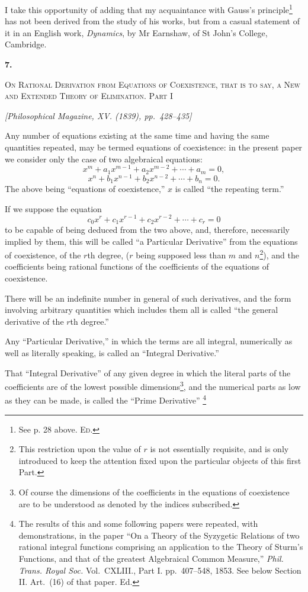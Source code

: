 \documentclass[11pt]{article}
\newcommand{\paperhead}[3]{%
  \clearpage
  \begin{center}
  {\Large\bfseries #1.}\par\vspace{0.85em}
  {\large\scshape #2}\par\vspace{0.6em}
  {\itshape [#3]}\par
  \end{center}\vspace{0.4em}}
\newcommand{\sourcepage}[1]{\marginpar{\scriptsize p.~#1}}
\begin{document}
I take this opportunity of adding that my acquaintance with Gauss's principle\footnote{See p. 28 above. \textsc{Ed.}} has not been derived from the study of his works, but from a casual statement of it in an English work, \emph{Dynamics}, by Mr Earnshaw, of St John's College, Cambridge.



\paperhead{7}{On Rational Derivation from Equations of Coexistence, that is to say, a New and Extended Theory of Elimination. Part I}{Philosophical Magazine, XV. (1839), pp.~428--435}

\sourcepage{40}
Any number of equations existing at the same time and having the same quantities repeated, may be termed equations of coexistence: in the present paper we consider only the case of two algebraical equations:
\[
 x^m+a_1x^{m-1}+a_2x^{m-2}+\cdots+a_m=0,
\]
\[
 x^n+b_1x^{n-1}+b_2x^{n-2}+\cdots+b_n=0.
\]
The above being ``equations of coexistence,'' $x$ is called ``the repeating term.''

If we suppose the equation
\[
 c_0x^r+c_1x^{r-1}+c_2x^{r-2}+\cdots+c_r=0
\]
to be capable of being deduced from the two above, and, therefore, necessarily implied by them, this will be called ``a Particular Derivative'' from the equations of coexistence, of the $r$th degree, ($r$ being supposed less than $m$ and $n$\footnote{This restriction upon the value of $r$ is not essentially requisite, and is only introduced to keep the attention fixed upon the particular objects of this first Part.}), and the coefficients being rational functions of the coefficients of the equations of coexistence.

There will be an indefinite number in general of such derivatives, and the form involving arbitrary quantities which includes them all is called ``the general derivative of the $r$th degree.''

Any ``Particular Derivative,'' in which the terms are all integral, numerically as well as literally speaking, is called an ``Integral Derivative.''

That ``Integral Derivative'' of any given degree in which the literal parts of the coefficients are of the lowest possible dimensions\footnote{Of course the dimensions of the coefficients in the equations of coexistence are to be understood as denoted by the indices subscribed.}, and the numerical parts as low as they can be made, is called the ``Prime Derivative''
\footnote{The results of this and some following papers were repeated, with demonstrations, in the paper ``On a Theory of the Syzygetic Relations of two rational integral functions comprising an application to the Theory of Sturm's Functions, and that of the greatest Algebraical Common Measure,'' \emph{Phil. Trans. Royal Soc.} Vol.~CXLIII., Part I. pp.~407--548, 1853. See below Section II. Art.~(16) of that paper. Ed.}
\end{document}
